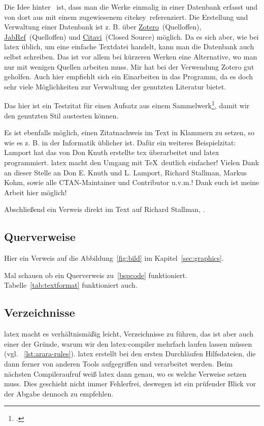 Die Idee hinter \ ist, dass man die Werke einmalig in einer Datenbank erfasst und von dort aus mit einem zugewiesenem \glqq citekey\grqq\ referenziert. Die Erstellung und Verwaltung einer Datenbank ist z. B. über \href{https://www.zotero.org/}{Zotero}\ (Quelloffen), \href{https://www.jabref.org/}{JabRef}\ (Quelloffen) und \href{https://www.citavi.com/}{Citavi}\ (Closed Source) möglich. Da es sich aber, wie bei \gls{latex} üblich, um eine einfache Textdatei handelt, kann man die Datenbank auch selbst
schreiben. Das ist vor allem bei kürzeren Werken eine Alternative, wo man nur mit wenigen Quellen arbeiten muss.
Mir hat bei der Verwendung Zotero gut geholfen. Auch hier empfiehlt sich ein Einarbeiten in das Programm, da es doch sehr viele Möglichkeiten zur Verwaltung der genutzten Literatur bietet.

Das hier ist ein Testzitat für einen Aufsatz aus einem Sammelwerk\footcite[][]{billen_kundenbindung_2005}, damit wir den genutzten Stil austesten können.

Es ist ebenfalls möglich, einen Zitatnachweis im Text in Klammern zu setzen, so wie es z. B. in der Informatik üblicher ist. Dafür ein weiteres Beispielzitat: Lamport \parencite[Siehe][]{lamport_latex_1994} hat das von Don Knuth \parencite[Siehe][]{knuth_tex_1979} erstellte \gls{tex} überarbeitet und \gls{latex} programmiert. \gls{latex} macht den Umgang mit \TeX{}\ deutlich einfacher! Vielen Dank an dieser Stelle an Don E. Knuth und L. Lamport, Richard Stallman, Markus Kohm, sowie alle CTAN-Maintainer und Contributor u.v.m.! Dank euch ist meine Arbeit hier möglich!

Abschließend ein Verweis direkt im Text auf Richard Stallman, \cite[siehe][S. 28 -- 48]{dibona_gnu_1999}.
\subsection{Querverweise}%
\label{sec:refs}
Hier ein Verweis auf die Abbildung~\ref{fig:bild} im Kapitel~\ref{sec:graphics}.

Mal schauen ob ein Querverweis zu~\ref{bspcode} funktioniert. Tabelle~\ref{tab:textformat} funktioniert auch.
\subsection{Verzeichnisse}%
\label{sec:catalogs}
\gls{latex} macht es verhältnismäßig leicht, Verzeichnisse zu führen, das ist aber auch einer der Gründe, warum wir den \gls{latex}-\gls{compiler} mehrfach laufen lassen müssen (vgl. ~\ref{lst:arara-rules}). \gls{latex} erstellt bei den ersten Durchläufen Hilfsdateien, die dann ferner von anderen Tools aufgegriffen und verarbeitet werden. Beim nächsten Compileraufruf weiß \gls{latex} dann genau, wo es welche Verweise setzen muss. Dies geschieht nicht immer Fehlerfrei, deswegen ist ein prüfender Blick vor der Abgabe dennoch zu empfehlen.

